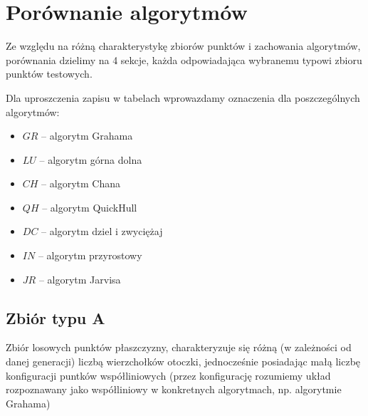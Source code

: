 \documentclass[11pt]{article}
\theoremstyle{remark} \newtheorem{definition}{def.}
\theoremstyle{definition} \newtheorem{twierdzenie}{tw.}
\begin{document}
\section{Porównanie algorytmów}

Ze względu na różną charakterystykę zbiorów punktów i zachowania algorytmów, porównania dzielimy na 4 sekcje, każda odpowiadająca wybranemu typowi zbioru punktów testowych. 

Dla uproszczenia zapisu w tabelach wprowazdamy oznaczenia dla poszczególnych algorytmów:

\begin{itemize}
    \item $GR$ -- algorytm Grahama
    \item $LU$ -- algorytm górna dolna 
    \item $CH$ -- algorytm Chana
    \item $QH$ -- algorytm QuickHull
    \item $DC$ -- algorytm dziel i zwyciężaj 
    \item $IN$ -- algorytm przyrostowy
    \item $JR$ -- algorytm Jarvisa
\end{itemize}


\subsection{Zbiór typu A}

Zbiór losowych punktów płaszczyzny, charakteryzuje się różną (w zależności od danej generacji) liczbą wierzchołków otoczki, jednocześnie posiadając małą liczbę konfiguracji puntków współliniowych (przez konfigurację rozumiemy
układ rozpoznawany jako współliniowy w konkretnych algorytmach, np. algorytmie Grahama)
\end{document}
